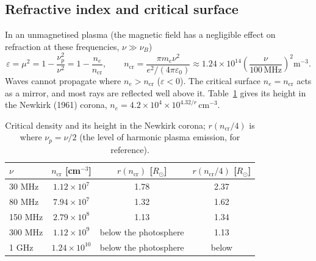 \documentclass[11pt,a4paper]{article}
\newcommand{\ncr}{n_\mathrm{cr}}
\newcommand{\rsun}{R_\odot}
\begin{document}
\subsection{Refractive index and critical surface}
In an unmagnetised plasma (the magnetic field has a negligible effect on refraction at these
frequencies, $\nu\gg\nu_B$)
\begin{equation}
  \varepsilon=\mu^2=1-\frac{\nu_p^2}{\nu^2}=1-\frac{n_e}{\ncr},\qquad
  \ncr=\frac{\pi m_e\nu^2}{e^2/(4\pi\varepsilon_0)}
  \approx1.24\times10^{14}\left(\frac{\nu}{100\,\text{MHz}}\right)^2\text{m}^{-3}.
  \label{eq:eps}
\end{equation}
Waves cannot propagate where $n_e>\ncr$ ($\varepsilon<0$). The critical surface $n_e=\ncr$ acts
as a mirror, and most rays are reflected well above it. Table~\ref{tab:levels} gives its height in
the Newkirk (1961) corona, $n_e=4.2\times10^4\times10^{4.32/r}$\,cm$^{-3}$.

\begin{table}[ht]
\centering\small
\caption{Critical density and its height in the Newkirk corona; $r(\ncr/4)$ is where
$\nu_p=\nu/2$ (the level of harmonic plasma emission, for reference).}
\label{tab:levels}
\begin{tabular}{@{}l c c c@{}}
\toprule
$\nu$ & $\ncr$ [cm$^{-3}$] & $r(\ncr)$ [$\rsun$] & $r(\ncr/4)$ [$\rsun$] \\
\midrule
30 MHz  & $1.12\times10^{7}$ & 1.78 & 2.37 \\
80 MHz  & $7.94\times10^{7}$ & 1.32 & 1.62 \\
150 MHz & $2.79\times10^{8}$ & 1.13 & 1.34 \\
300 MHz & $1.12\times10^{9}$ & below the photosphere & 1.13 \\
1 GHz   & $1.24\times10^{10}$ & below the photosphere & below \\
\bottomrule
\end{tabular}
\end{table}
\end{document}
